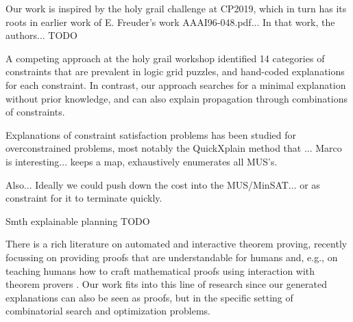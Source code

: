 Our work is inspired by the holy grail challenge at CP2019, which in turn has its roots in earlier work of E. Freuder's work \cite{}AAAI96-048.pdf... In that work, the authors... TODO

A competing approach at the holy grail workshop \cite{} identified 14 categories of constraints that are prevalent in logic grid puzzles, and hand-coded explanations for each constraint. In contrast, our approach searches for a minimal explanation without prior knowledge, and can also explain propagation through combinations of constraints.

Explanations of constraint satisfaction problems has been studied for overconstrained problems, most notably the QuickXplain method \cite{} that ...
Marco is interesting... keeps a map, exhaustively enumerates all MUS's.

Also...  Ideally we could push down the cost into the MUS/MinSAT... or as constraint for it to terminate quickly.

Smth explainable planning TODO



There is a rich literature on automated and interactive theorem proving, recently focussing on providing proofs that are understandable for humans \cite{Ganesalingam2017} and, e.g.,  on teaching humans how to craft mathematical proofs using interaction with theorem provers \cite{DBLP:conf/icml/YangD19}. 
Our work fits into this line of research since our generated explanations can also be seen as proofs, but in the specific setting of combinatorial search and optimization problems.
